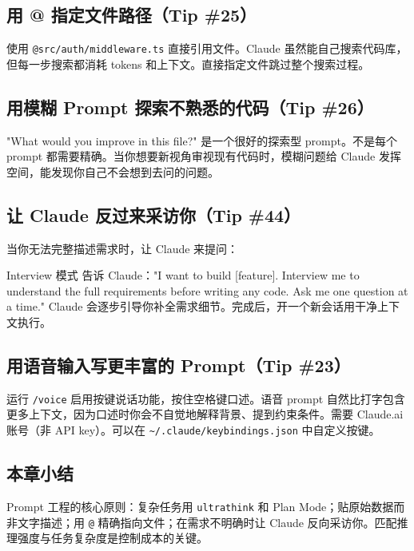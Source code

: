 \documentclass[a4paper]{article}
\begin{document}
\subsection{用 @ 指定文件路径（Tip \#25）}

使用 \texttt{@src/auth/middleware.ts} 直接引用文件。Claude 虽然能自己搜索代码库，但每一步搜索都消耗 tokens 和上下文。直接指定文件跳过整个搜索过程。

\subsection{用模糊 Prompt 探索不熟悉的代码（Tip \#26）}

"What would you improve in this file?" 是一个很好的探索型 prompt。不是每个 prompt 都需要精确。当你想要新视角审视现有代码时，模糊问题给 Claude 发挥空间，能发现你自己不会想到去问的问题。

\subsection{让 Claude 反过来采访你（Tip \#44）}

当你无法完整描述需求时，让 Claude 来提问：

\begin{importantbox}{Interview 模式}
告诉 Claude："I want to build [feature]. Interview me to understand the full requirements before writing any code. Ask me one question at a time." Claude 会逐步引导你补全需求细节。完成后，开一个新会话用干净上下文执行。
\end{importantbox}

\subsection{用语音输入写更丰富的 Prompt（Tip \#23）}

运行 \texttt{/voice} 启用按键说话功能，按住空格键口述。语音 prompt 自然比打字包含更多上下文，因为口述时你会不自觉地解释背景、提到约束条件。需要 Claude.ai 账号（非 API key）。可以在 \texttt{\textasciitilde/.claude/keybindings.json} 中自定义按键。

\subsection{本章小结}

Prompt 工程的核心原则：复杂任务用 \texttt{ultrathink} 和 Plan Mode；贴原始数据而非文字描述；用 \texttt{@} 精确指向文件；在需求不明确时让 Claude 反向采访你。匹配推理强度与任务复杂度是控制成本的关键。
\end{document}
